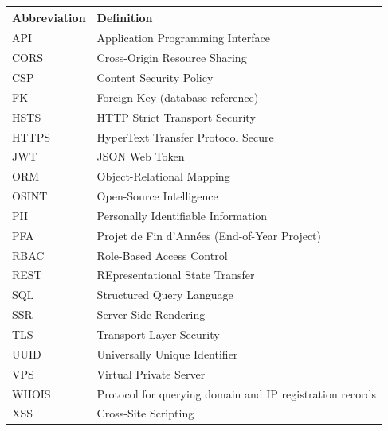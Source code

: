 \vspace{0.5cm}
\renewcommand{\arraystretch}{1.35}
\begin{longtable}{@{} l L{10.5cm} @{}}
\toprule
\textbf{Abbreviation} & \textbf{Definition} \\
\midrule
\endhead
API   & Application Programming Interface \\
CORS  & Cross-Origin Resource Sharing \\
CSP   & Content Security Policy \\
FK    & Foreign Key (database reference) \\
HSTS  & HTTP Strict Transport Security \\
HTTPS & HyperText Transfer Protocol Secure \\
JWT   & JSON Web Token \\
ORM   & Object-Relational Mapping \\
OSINT & Open-Source Intelligence \\
PII   & Personally Identifiable Information \\
PFA   & Projet de Fin d'Ann\'ees (End-of-Year Project) \\
RBAC  & Role-Based Access Control \\
REST  & REpresentational State Transfer \\
SQL   & Structured Query Language \\
SSR   & Server-Side Rendering \\
TLS   & Transport Layer Security \\
UUID  & Universally Unique Identifier \\
VPS   & Virtual Private Server \\
WHOIS & Protocol for querying domain and IP registration records \\
XSS   & Cross-Site Scripting \\
\bottomrule
\end{longtable}

\clearpage
